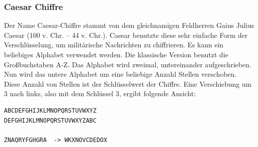\subsubsection{Caesar Chiffre}

Der Name Caesar-Chiffre stammt von dem gleichnamigen Feldherren Gaius Julius
Caesar (100 v. Chr. – 44 v. Chr.). Caesar benutzte diese sehr einfache Form der
Verschlüsselung, um militärische Nachrichten zu chiffrieren.  Es kann ein
beliebiges Alphabet verwendet werden. Die klassische Version benutzt die
Großbuchstaben A-Z. Das Alphabet wird zweimal, untereinander aufgeschrieben.
Nun wird das untere Alphabet um eine beliebige Anzahl Stellen verschoben. Diese
Anzahl von Stellen ist der Schlüsselwert der Chiffre. Eine Verschiebung um 3
nach links, also mit dem Schlüssel 3, ergibt folgende Ansicht:

\begin{lstlisting}
ABCDEFGHIJKLMNOPQRSTUVWXYZ
DEFGHIJKLMNOPQRSTUVWXYZABC

ZNAQRYFGHGRA  -> WKXNOVCDEDOX
\end{lstlisting}
